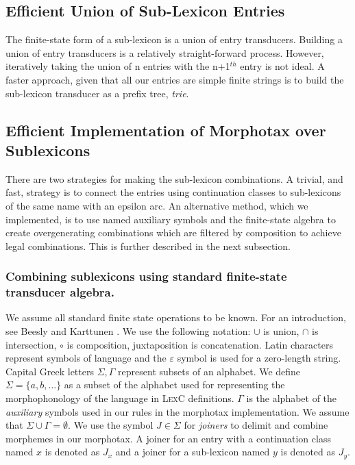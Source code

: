 \documentclass[a4paper]{article}
\begin{document}
\subsection{Efficient Union of Sub-Lexicon Entries}
\label{subsec:lexc-union}

The finite-state form of a sub-lexicon is a union of entry
transducers.  Building a union of entry transducers is a relatively
straight-forward process. However, iteratively taking the union of n
entries with the n+1$^{th}$ entry is not ideal. A faster approach,
given that all our entries are simple finite strings is to build the
sub-lexicon transducer as a prefix tree, \emph{trie}.

\subsection{Efficient Implementation of Morphotax over Sublexicons}
\label{subsec:lexc-morphotax}

There are two strategies for making the sub-lexicon combinations. A
trivial, and fast, strategy is to connect the entries using
continuation classes to sub-lexicons of the same name with an epsilon
arc. An alternative method, which we implemented, is to use named
auxiliary symbols and the finite-state algebra to create
overgenerating combinations which are filtered by composition to
achieve legal combinations. This is further described in the next
subsection.

\subsubsection{Combining sublexicons using standard finite-state transducer algebra.}
We assume all standard finite state operations to be known. For an
introduction, see Beesly and Karttunen \cite{beesley03}. We use the
following notation: $\cup$ is union, $\cap$ is intersection, $\circ$
is composition, juxtaposition is concatenation. Latin characters
represent symbols of language and the $\varepsilon$ symbol is used for
a zero-length string.  Capital Greek letters $\Sigma, \Gamma$
represent subsets of an alphabet.  We define $\Sigma = \{a, b,
\ldots\}$ as a subset of the alphabet used for representing the
morphophonology of the language in \textsc{LexC} definitions. $\Gamma$
is the alphabet of the \emph{auxiliary} symbols used in our rules in
the morphotax implementation. We assume that $\Sigma \cup \Gamma =
\emptyset$.  We use the symbol $J \in \Sigma$ for \emph{joiners} to
delimit and combine morphemes in our morphotax.  A joiner for an entry
with a continuation class named $x$ is denoted as $J_{x}$ and a joiner
for a sub-lexicon named $y$ is denoted as $J_{y}$.
\end{document}
